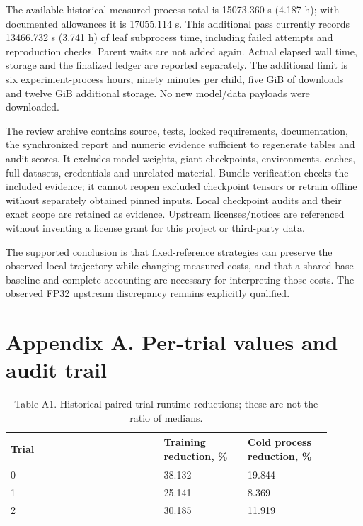 \documentclass[10pt]{article}
\begin{document}
The available historical measured process total is 15073.360 s (4.187 h); with documented allowances it is 17055.114 s. This additional pass currently records 13466.732 s (3.741 h) of leaf subprocess time, including failed attempts and reproduction checks. Parent waits are not added again. Actual elapsed wall time, storage and the finalized ledger are reported separately. The additional limit is six experiment-process hours, ninety minutes per child, five GiB of downloads and twelve GiB additional storage. No new model/data payloads were downloaded.


The review archive contains source, tests, locked requirements, documentation, the synchronized report and numeric evidence sufficient to regenerate tables and audit scores. It excludes model weights, giant checkpoints, environments, caches, full datasets, credentials and unrelated material. Bundle verification checks the included evidence; it cannot reopen excluded checkpoint tensors or retrain offline without separately obtained pinned inputs. Local checkpoint audits and their exact scope are retained as evidence. Upstream licenses/notices are referenced without inventing a license grant for this project or third-party data.


The supported conclusion is that fixed-reference strategies can preserve the observed local trajectory while changing measured costs, and that a shared-base baseline and complete accounting are necessary for interpreting those costs. The observed FP32 upstream discrepancy remains explicitly qualified.


\section*{Appendix A. Per-trial values and audit trail}

\begin{table}[htbp]\centering\footnotesize\caption{Table A1. Historical paired-trial runtime reductions; these are not the ratio of medians.}
\begin{tabular}{p{0.426\linewidth}p{0.237\linewidth}p{0.237\linewidth}}
\toprule
Trial & Training reduction, \% & Cold process reduction, \% \\ \midrule
0 & 38.132 & 19.844 \\
1 & 25.141 & 8.369 \\
2 & 30.185 & 11.919 \\
\bottomrule\end{tabular}\end{table}
\end{document}
